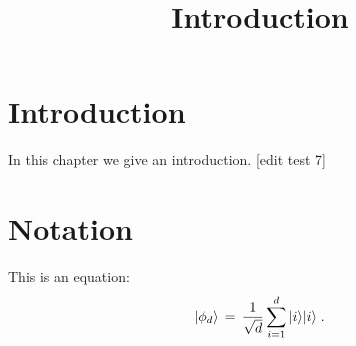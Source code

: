 

%


\title{Introduction}
\label{introduction}


\maketitle

\label{section-phantom}

\tableofcontents

\section{Introduction}
\label{section:introduction}

In this chapter we give an introduction. [edit test 7]

\section{Notation}
\label{section-notation}

This is an equation:
\begin{equation}
\label{eq:me-state}
 |\phi_d\rangle \,=\,\frac{1}{\sqrt{d}} \sum_{i=1}^d |i\rangle|i\rangle\;.
\end{equation}








